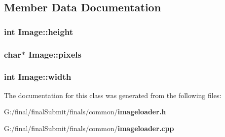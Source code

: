 \subsection{Member Data Documentation}
\subsubsection[{height}]{\setlength{\rightskip}{0pt plus 5cm}int Image\-::height}\label{class_image_a51df43db420c9c0b57536cb2dd36de5c}
\subsubsection[{pixels}]{\setlength{\rightskip}{0pt plus 5cm}char$\ast$ Image\-::pixels}\label{class_image_a6afbcf4b0a2774f020ce350bff9d0d6c}
\subsubsection[{width}]{\setlength{\rightskip}{0pt plus 5cm}int Image\-::width}\label{class_image_ab8d12f635013c04159cd4d3d972bac88}


The documentation for this class was generated from the following files\-:\begin{DoxyCompactItemize}
\item 
G\-:/final/final\-Submit/finals/common/{\bf imageloader.\-h}\item 
G\-:/final/final\-Submit/finals/common/{\bf imageloader.\-cpp}\end{DoxyCompactItemize}
